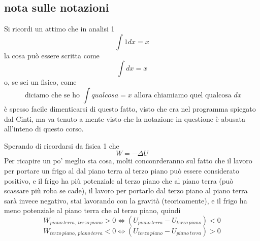 \documentclass{article}
\begin{document}
\subsection{nota sulle notazioni}
Si ricordi un attimo che in analisi 1
\[\int 1 dx = x\]
la cosa può essere scritta come
\[\int dx = x\]
o, se sei un fisico, come
\[ \text{ diciamo che se ho } \int qualcosa = x \text{ allora chiamiamo quel qualcosa } dx\]
è spesso facile dimenticarsi di questo fatto, visto che era nel programma spiegato dal Cinti, ma va tenuto a mente visto che la notazione in questione è abusata all'inteno di questo corso.

Sperando di ricordarsi da fisica 1 che
\[W=-\Delta U\]
Per ricapire un po' meglio sta cosa, molti conconrderanno sul fatto che il lavoro per portare un frigo al dal piano terra al terzo piano può essere considerato positivo, e il frigo ha più potenziale al terzo piano che al piano terra (può scassare più roba se cade), il lavoro per portarlo dal terzo piano al piano terra sarà invece negativo, stai lavorando con la gravità (teoricamente), e il frigo ha meno potenziale al piano terra che al terzo piano, quindi
\[W_{piano\ terra,\ terzo\ piano} > 0 \iff (U_{piano\ terra}-U_{terzo\ piano})<0\]
\[W_{terzo\ piano,\ piano\ terra} < 0 \iff (U_{terzo\ piano}-U_{piano\ terra})>0\]
\end{document}
